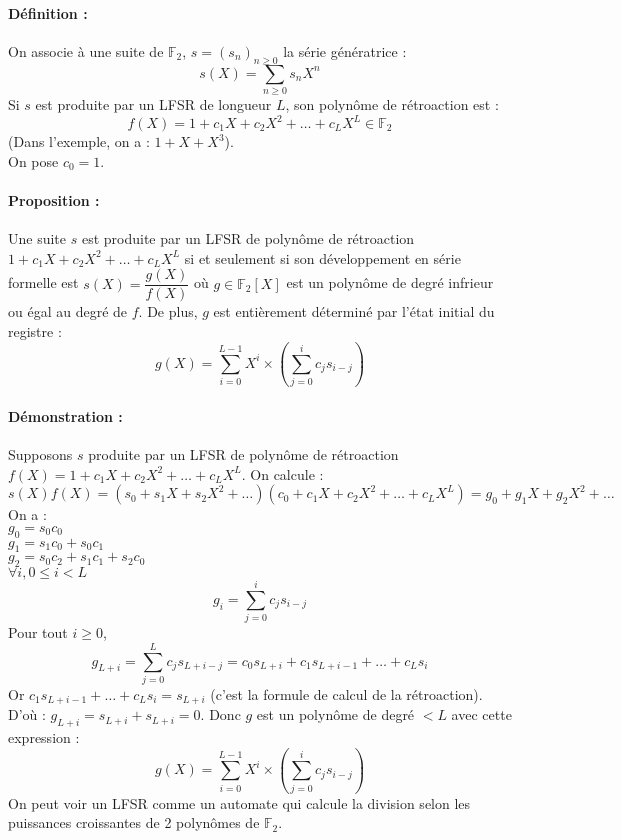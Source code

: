\documentclass[12pt,a4paper]{report}
\begin{document}
\paragraph{Définition :\\}
On associe à une suite de $\mathbb{F}_2$, $s=(s_n)_{n\geqslant 0}$ la série génératrice :
$$ s(X) = \sum_{n\geqslant 0} s_n X^n $$
Si $s$ est produite par un LFSR de longueur $L$, son polynôme de rétroaction est :
$$ f(X) = 1+c_1X+c_2X^2+\ldots + c_LX^L \in \mathbb{F}_2$$
(Dans l'exemple, on a : $ 1+X+X^3$).\\
On pose $c_0=1$.

\paragraph{Proposition :\\}
Une suite $s$ est produite par un LFSR de polynôme de rétroaction $1+c_1X+c_2X^2+\ldots + c_LX^L$ si et seulement si son développement en série formelle est $s(X) = \dfrac{g(X)}{f(X)}$ où $g \in \mathbb{F}_2[X]$ est un polynôme de degré infrieur ou égal au degré de $f$. De plus, $g$ est entièrement déterminé par l'état initial du registre :
$$ g(X) = \sum_{i=0}^{L-1} X^i \times \left( \sum_{j=0}^i c_j s_{i-j} \right) $$
\paragraph{Démonstration :\\}
Supposons $s$ produite par un LFSR de polynôme de rétroaction $f(X) = 1+c_1X+c_2X^2+\ldots + c_LX^L$. On calcule :
$$s(X)f(X)=(s_0+s_1X+s_2X^2+ \ldots )(c_0 + c_1X+c_2X^2 + \ldots + c_LX^L ) = g_0 + g_1 X +g_2X^2 + \ldots $$
On a : \\
$g_0 = s_0c_0$\\
$g_1 = s_1c_0+s_0c_1 $\\
$g_2 = s_0c_2 + s_1c_1 +s_2c_0 $\\
$\forall i, 0 \leqslant i < L$
$$ g_i=\sum_{j=0}^i c_js_{i-j} $$
Pour tout $i \geqslant 0$, 
$$ g_{L+i} = \sum_{j=0}^L c_j s_{L+i-j} = c_0s_{L+i} + c_1s_{L+i-1} + \ldots + c_Ls_i $$
Or $ c_1s_{L+i-1} + \ldots + c_Ls_i  = s_{L+i} $ (c'est la formule de calcul de la rétroaction).
D'où : $ g_{L+i} =  s_{L+i} + s_{L+i} = 0$.
Donc $g$ est un polynôme de degré $<L$ avec cette expression :
$$ g(X) = \sum_{i=0}^{L-1} X^i \times \left( \sum_{j=0}^i c_j s_{i-j} \right) $$
On peut voir un LFSR comme un automate qui calcule la division selon les puissances croissantes de 2 polynômes de $\mathbb{F}_2$.
\end{document}
